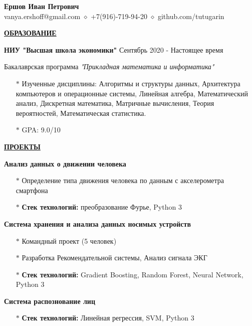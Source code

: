\documentclass[11pt]{article}
\begin{document}
\begin{center}
\thispagestyle{empty}
\large \textbf{Ершов Иван Петрович \\}    
\normalsize vanya.ershoff@gmail.com $\diamond$ +7(916)-719-94-20 $\diamond$ github.com/tutugarin   \\
\hrulefill
\end{center}

\noindent \textbf{\underline{ОБРАЗОВАНИЕ}} \\
\par \textbf{НИУ "Высшая школа экономики"} \hfill Сентябрь 2020 - Настоящее время
\par Бакалаврская программа \textit{"Прикладная математика и информатика" } 
\begin{itemize}
\item[$\ast$] Изученные дисциплины: Алгоритмы и структуры данных, Архитектура компьютеров и операционные системы, Линейная алгебра, Математический анализ, Дискретная математика, Матричные вычисления, Теория вероятностей, Математическая статистика.

\item[$\ast$] GPA: 9.0/10
\end{itemize}

\noindent \textbf{\underline{ПРОЕКТЫ}} \\
\par \textbf{\large{Анализ данных о движении человека}}
\begin{itemize}
\item[$\ast$] Определение типа движения человека по данным с акселерометра смартфона
\item[$\ast$] \textbf{Стек технологий:} преобразование Фурье, Python 3
\end{itemize}

\par \textbf{\large{Система хранения и анализа данных носимых устройств}}
\begin{itemize}
\item[$\ast$] Командный проект (5 человек)
\item[$\ast$] Разработка Рекомендательной системы, Анализ сигнала ЭКГ
\item[$\ast$] \textbf{Стек технологий:} Gradient Boosting, Random Forest, Neural Network, Python 3
\end{itemize}

\par \textbf{\large{Система распознование лиц}}
\begin{itemize}
\item[$\ast$] \textbf{Стек технологий:} Линейная регрессия, SVM, Python 3
\end{itemize}
\end{document}
